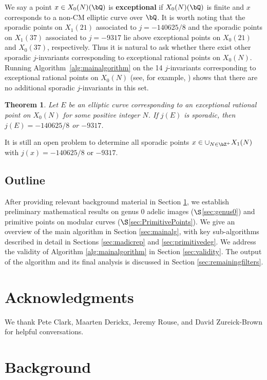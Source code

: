 \documentclass[11pt,reqno]{amsart}
\theoremstyle{plain}
\newtheorem{theorem}{Theorem}%
\theoremstyle{definition}
\newcommand{\Q}{\bQ}
\newcommand{\Z}{\bZ}
\newcommand{\abedit}[1]{{\color{blue} #1}}
\begin{document}
We say a point $x \in X_0(N)(\Q)$ is \textbf{exceptional} if $X_0(N)(\Q)$ is finite and $x$ corresponds to a non-CM elliptic curve over $\Q$. It is worth noting that the sporadic points on $X_1(21)$ associated to $j=-140625/8$ and the sporadic points on $X_1(37)$ associated to $j=-9317$ lie above exceptional points on $X_0(21)$ and $X_0(37)$, respectively. Thus it is natural to ask whether there exist other sporadic \abedit{$j$-invariants corresponding to} exceptional rational points on $X_0(N)$. Running Algorithm~\ref{alg:mainalgorithm} on the 14 $j$-invariants corresponding to exceptional rational points on $X_0(N)$ (see, for example, \cite[Table 4]{LRAnn}) shows that there are no additional sporadic $j$-invariants in this set.
\begin{theorem}
Let $E$ be an elliptic curve corresponding to an exceptional rational point on $X_0(N)$ for some positive integer $N$. \abedit{If $j(E)$ is sporadic, then $j(E)=-140625/8$ or $-9317$.}
\end{theorem}

It is still an open problem to determine all sporadic points $x \in \cup_{N \in \Z^+} X_1(N)$ with $j(x) =-140625/8$ or $-9317$.

\subsection{Outline}
After providing relevant background material in Section \ref{sec:background}, we establish  preliminary mathematical results on genus 0 adelic images ($\S$\ref{sec:genus0}) and primitive points on modular curves ($\S$\ref{sec:PrimitivePoints}). We give an overview of the main algorithm in Section \ref{sec:mainalg}, with key sub-algorithms described in detail in Sections \ref{sec:madicrep} and \ref{sec:primitivedeg}. We address the validity of Algorithm \ref{alg:mainalgorithm} in Section \ref{sec:validity}. The output of the algorithm and its final analysis is discussed in Section \ref{sec:remainingfilters}.

\section*{Acknowledgments}
We thank Pete Clark, Maarten Derickx, Jeremy Rouse, and David Zureick-Brown for helpful conversations.

\section{Background}
\label{sec:background}
\end{document}

